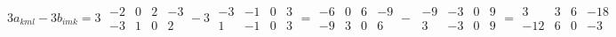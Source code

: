 \documentclass{article}
\begin{document}
\begin{center}
$$3a_{kml} - 3b_{imk} = 3\;\begin{array}{||cc|cc||}
-2 & 0 & 2 & -3 \\
-3 & 1 & 0 & 2
\end{array} - 3\;\begin{array}{||cc|cc||}
-3 & -1 & 0 & 3 \\
1 & -1 & 0 & 3
\end{array} = \begin{array}{||cc|cc||}
-6 & 0 & 6 & -9 \\
-9 & 3 & 0 & 6
\end{array} - \;\begin{array}{||cc|cc||}
-9 & -3 & 0 & 9 \\
3 & -3 & 0 & 9
\end{array} = \begin{array}{||cc|cc||}
3 & 3 & 6 & -18 \\
-12 & 6 & 0 & -3
\end{array}$$
\end{center}
\end{document}
